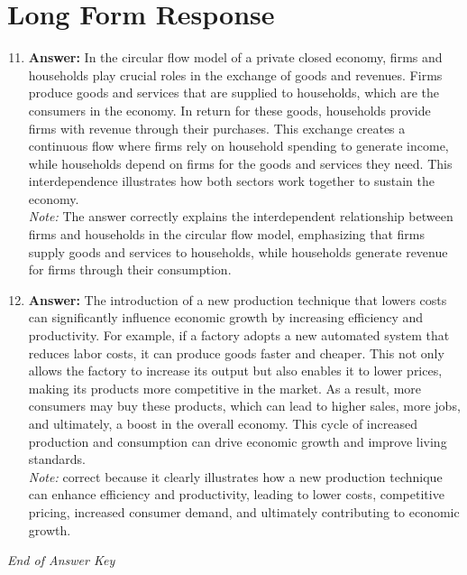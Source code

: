 \documentclass[12pt]{article}
\begin{document}
\section*{Long Form Response}
\begin{enumerate}[label=\arabic*.]
\setcounter{enumi}{10}
\item \textbf{Answer:} In the circular flow model of a private closed economy, firms and households play crucial roles in the exchange of goods and revenues. Firms produce goods and services that are supplied to households, which are the consumers in the economy. In return for these goods, households provide firms with revenue through their purchases. This exchange creates a continuous flow where firms rely on household spending to generate income, while households depend on firms for the goods and services they need. This interdependence illustrates how both sectors work together to sustain the economy.
\\ \textit{Note:} The answer correctly explains the interdependent relationship between firms and households in the circular flow model, emphasizing that firms supply goods and services to households, while households generate revenue for firms through their consumption.
\item \textbf{Answer:} The introduction of a new production technique that lowers costs can significantly influence economic growth by increasing efficiency and productivity. For example, if a factory adopts a new automated system that reduces labor costs, it can produce goods faster and cheaper. This not only allows the factory to increase its output but also enables it to lower prices, making its products more competitive in the market. As a result, more consumers may buy these products, which can lead to higher sales, more jobs, and ultimately, a boost in the overall economy. This cycle of increased production and consumption can drive economic growth and improve living standards.
\\ \textit{Note:} correct because it clearly illustrates how a new production technique can enhance efficiency and productivity, leading to lower costs, competitive pricing, increased consumer demand, and ultimately contributing to economic growth.
\end{enumerate}

\vfill
\noindent\textit{End of Answer Key}
\end{document}
